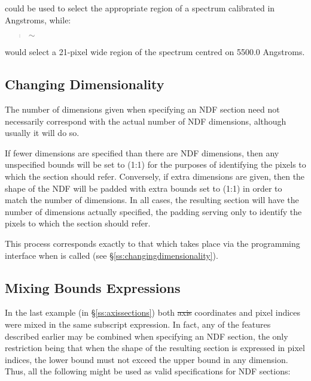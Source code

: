 could be used to select the appropriate region of a spectrum calibrated
in Angstroms, while:

\small
\begin{quote}
\begin{center}
$\sim$
\end{center}
\end{quote}
\normalsize

would select a 21-pixel wide region of the spectrum centred on 5500.0
Angstroms.

\subsection{Changing Dimensionality}

The number of dimensions given when specifying an NDF section need not
necessarily correspond with the actual number of NDF dimensions, although
usually it will do so.

If fewer dimensions are specified than there are NDF dimensions, then any
unspecified bounds will be set to (1:1) for the purposes of identifying the
pixels to which the section should refer. Conversely, if extra dimensions are
given, then the shape of the NDF will be padded with extra bounds set
to (1:1) in order to match the number of dimensions. In all cases, the
resulting section will have the number of dimensions actually
specified, the padding serving only to identify the pixels to which
the section should refer.

This process corresponds exactly to that which takes place via the
programming interface when  is called (see
\S\ref{ss:changingdimensionality}).

\subsection{Mixing Bounds Expressions}

In the last example (in \S\ref{ss:axissections}) both \st{axis\/} coordinates
and pixel indices were mixed in the same subscript expression. In fact, any of
the features described earlier may be combined when specifying an NDF section,
the only restriction being that when the shape of the resulting section is
expressed in pixel indices, the lower bound must not exceed the upper bound in
any dimension. Thus, all the following might be used as valid specifications for
NDF sections:

